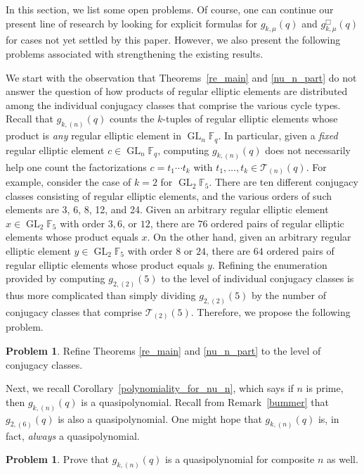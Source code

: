 \documentclass[10pt]{article}
\theoremstyle{definition}
\DeclareMathOperator{\GL}{GL}
\newcommand{\F}{\mathbb{F}}
\newcommand{\CT}{\mathcal{T}}
\newtheorem{problem}[cdrthm]{Problem}
\begin{document}
In this section, we list some open problems.
Of course, one can continue our present line of research by looking for explicit formulas for \(g_{k,\mu} (q)\) and \(g_{k,\mu}^\Box (q)\) for cases not yet settled by this paper.
However, we also present the following problems associated with strengthening the existing results.

We start with the observation that Theorems~\ref{re_main} and \ref{nu_n_part} do not answer the question of how products of regular elliptic elements are distributed among the individual conjugacy classes that comprise the various cycle types.
Recall that \(g_{k,(n)} (q)\) counts the \(k\)-tuples of regular elliptic elements whose product is \emph{any} regular elliptic element in \(\GL_n \F_q\).
In particular, given a \emph{fixed} regular elliptic element \(c \in \GL_n \F_q\), computing \(g_{k,(n)} (q)\) does not necessarily help one count the factorizations \(c = t_1 \cdots t_k\) with \(t_1,\ldots,t_k \in \CT_{(n)} (q)\).
For example, consider the case of \(k=2\) for \(\GL_2 \F_5\).
There are ten different conjugacy classes consisting of regular elliptic elements, and the various orders of such elements are 3, 6, 8, 12, and 24.
Given an arbitrary regular elliptic element \(x \in \GL_2 \F_5\) with order \(3, 6\), or \(12\), there are \(76\) ordered pairs of regular elliptic elements whose product equals \(x\).
On the other hand,
given an arbitrary regular elliptic element \(y \in \GL_2 \F_5\) with order \(8\) or \(24\), there are \(64\) ordered pairs of regular elliptic elements whose product equals \(y\).
Refining the enumeration provided by computing \(g_{2,(2)} (5)\) to the level of individual conjugacy classes is thus more complicated than simply dividing \(g_{2,(2)} (5)\) by the number of conjugacy classes that comprise \(\CT_{(2)} (5)\).
Therefore, we propose the following problem.

\begin{problem}
Refine Theorems \ref{re_main} and \ref{nu_n_part} to the level of conjugacy classes.
\end{problem}


Next, we recall Corollary~\ref{polynomiality_for_nu_n}, which says if \(n\) is prime, then \(g_{k,(n)} (q)\) is a quasipolynomial.
Recall from Remark~\ref{bummer} that \(g_{2,(6)} (q)\) is also a quasipolynomial.
One might hope that \(g_{k,(n)}(q)\) is, in fact, \emph{always} a quasipolynomial.

\begin{problem}
\label{prob:quasipoly}
Prove that \(g_{k,(n)} (q)\) is a quasipolynomial for composite \(n\) as well.
\end{problem}
\end{document}
